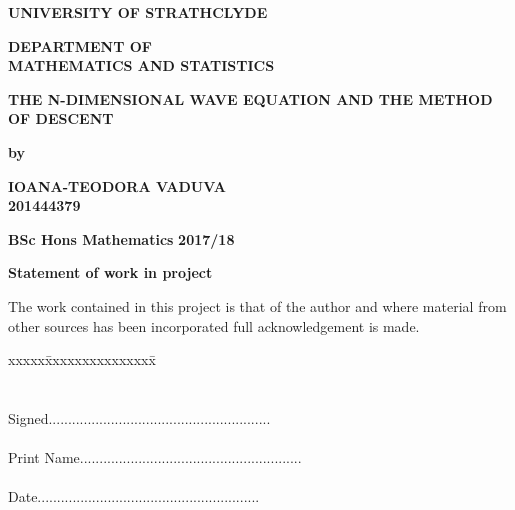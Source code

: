 \documentclass[a4paper, 12pt]{article}
\numberwithin{equation}{section}
\begin{document}
\thispagestyle{empty}
\Large
\vspace*{2cm}
\begin{center}
    \textbf{UNIVERSITY OF STRATHCLYDE}
\end{center}

\vspace*{1cm}
\begin{center}
    \textbf{DEPARTMENT OF\\ MATHEMATICS AND STATISTICS}
\end{center}

\vspace*{1cm}
\begin{center}
    \textbf{THE N-DIMENSIONAL WAVE EQUATION AND THE METHOD OF DESCENT}
\end{center}

\vspace*{1cm}
\begin{center}
    \textbf{by}
\end{center}

\vspace*{1cm}
\begin{center}
    \textbf{IOANA-TEODORA VADUVA}\\
    \textbf{201444379}
\end{center}

\vspace*{3cm}
\begin{center}
    \textbf{BSc Hons Mathematics}
    \textbf{2017/18}
\end{center}

\newpage
\Large

\vspace*{1cm}
\begin{center}
    \textbf{Statement of work in project}
\end{center}

\vspace*{1cm}
\begin{center}
    \parbox{14cm}{
        The work contained in this project is that of the author and where
        material from other sources has been incorporated full acknowledgement
        is made.}
    \end{center}
    
    \begin{center}
        \begin{tabbing}
            xxxxx\=xxxxxxxxxxxxxxx\= \kill
            \\
            \\
            \\
            \>Signed\>.........................................................\\
            \\
            \>Print Name\>.........................................................\\
            \\
            \>Date\>.........................................................\\
        \end{tabbing}
    \end{center}
    
\end{document}
